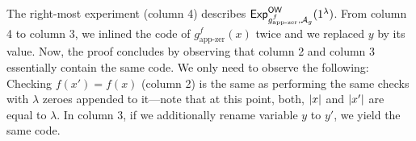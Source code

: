 \begin{center}
\begin{pchstack}
		    \pchspace
		\pchspace
				\pchspace
\end{pchstack}
\end{center}

The right-most experiment (column 4) describes ${\mathsf{Exp}}_{g^f_{\text{app-zer}},\mathcal{A}_g}^{\mathsf{OW}}(1^\lambda)$.
From column 4 to column 3, we inlined the code of $g^f_{\text{app-zer}}(x)$ twice and we replaced $y$ by its value. Now, the proof concludes by observing that column 2 and column 3 essentially contain the same code. We only need to observe the following: Checking $f(x')=f(x)$ (column 2) is the same as performing the same checks with $\lambda$ zeroes appended to it---note that at this point, both, $\left\lvert x\right\rvert$ and  $\left\lvert x'\right\rvert$ are equal to $\lambda$. In column 3, if we additionally rename variable $y$ to $y'$, we yield the same code.
